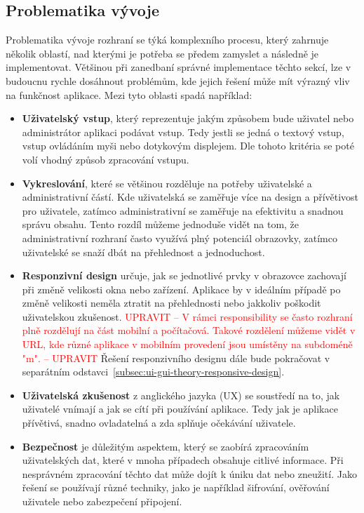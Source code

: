 \subsection{Problematika vývoje}
\label{subsec:ui-gui-theory-problems}
Problematika vývoje rozhraní se týká komplexního procesu, který zahrnuje několik oblastí, nad kterými je potřeba se předem zamyslet a následně je implementovat. Většinou při zanedbaní správné implementace těchto sekcí, lze v budoucnu rychle dosáhnout problémům, kde jejich řešení může mít výrazný vliv na funkčnost aplikace. Mezi tyto oblasti spadá například:

\begin{itemize}
    \item \textbf{Uživatelský vstup}, který reprezentuje jakým způsobem bude uživatel nebo administrátor aplikaci podávat vstup. Tedy jestli se jedná o textový vstup, vstup ovládáním myši nebo dotykovým displejem. Dle tohoto kritéria se poté volí vhodný způsob zpracování vstupu.
    \item \textbf{Vykreslování}, které se většinou rozděluje na potřeby uživatelské a administrativní částí. Kde uživatelská se zaměřuje více na design a přívětivost pro uživatele, zatímco administrativní se zaměřuje na efektivitu a snadnou správu obsahu. Tento rozdíl můžeme jednoduše vidět na tom, že administrativní rozhraní často využívá plný potenciál obrazovky, zatímco uživatelské se snaží dbát na přehlednost a jednoduchost.
    \item \textbf{Responzivní design} určuje, jak se jednotlivé prvky v obrazovce zachovají při změně velikosti okna nebo zařízení. Aplikace by v ideálním případě po změně velikosti neměla ztratit na přehlednosti nebo jakkoliv poškodit uživatelskou zkušenost. \textcolor{red}{UPRAVIT -- V rámci responsibility se často rozhraní plně rozdělují na část mobilní a počítačová. Takové rozdělení můžeme vidět v URL, kde různé aplikace v mobilním provedení jsou umístěny na subdoméně "m". -- UPRAVIT} Řešení responzivního designu dále bude pokračovat v separátním odstavci~\ref{subsec:ui-gui-theory-responsive-design}.
    \item \textbf{Uživatelská zkušenost} z anglického jazyka \textit{} (UX) se soustředí na to, jak uživatelé vnímají a jak se cítí při používání aplikace. Tedy jak je aplikace přívětivá, snadno ovladatelná a zda splňuje očekávání uživatele.
    \item \textbf{Bezpečnost} je důležitým aspektem, který se zaobírá zpracováním uživatelských dat, které v mnoha případech obsahuje citlivé informace. Při nesprávném zpracování těchto dat může dojít k úniku dat nebo zneužití. Jako řešení se používají různé techniky, jako je například šifrování, ověřování uživatele nebo zabezpečení připojení.
\end{itemize}

